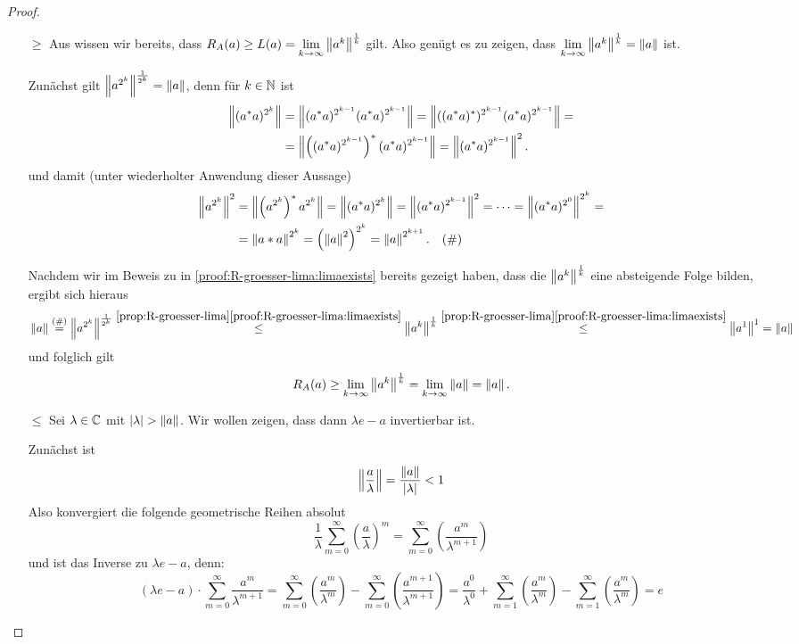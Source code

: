 \begin{proof}

\begin{itemize}
	\item[\glqq$\geq$\grqq] Aus  wissen wir bereits, dass $R_A(a) \geq L(a) = \underset{k\to\infty}{\lim}\left\lVert a^k\right\rVert^\frac{1}{k}$ gilt. Also genügt es zu zeigen, dass $\underset{k\to\infty}{\lim}\left\lVert a^k\right\rVert^\frac{1}{k} = \left\lVert a\right\rVert$ ist.
	
Zunächst gilt $\left\lVert a^{2^k}\right\rVert^\frac{1}{2^k} = \left\lVert a\right\rVert$, denn für $k \in \mathbb{N}$ ist
	\begin{align*}
	\left\lVert(a^*a)^{2^k}\right\rVert &= \left\lVert(a^*a)^{2^{k-1}}(a^*a)^{2^{k-1}}\right\rVert = \left\lVert((a^*a)^*)^{2^{k-1}}(a^*a)^{2^{k-1}}\right\rVert = \\
	&= \left\lVert\left((a^*a)^{2^{k-1}}\right)^*(a^*a)^{2^{k-1}}\right\rVert = \left\lVert(a^*a)^{2^{k-1}}\right\rVert^2.
	\end{align*}
und damit (unter wiederholter Anwendung dieser Aussage)
	\begin{align*}
	\left\lVert a^{2^k}\right\rVert^2 &= \left\lVert\left(a^{2^k}\right)^*a^{2^k}\right\rVert = \left\lVert(a^*a)^{2^k}\right\rVert = \left\lVert(a^*a)^{2^{k-1}}\right\rVert^2 = \dots = \left\lVert(a^*a)^{2^{0}}\right\rVert^{2^k} = \\
	&= \left\lVert a*a\right\rVert^{2^k} = \left(\left\lVert a\right\rVert^2\right)^{2^k} = \left\lVert a\right\rVert^{2^{k+1}}. \quad (\#)
	\end{align*}	
	
Nachdem wir im Beweis zu  in \ref{proof:R-groesser-lima:limaexists} bereits gezeigt haben, dass die $\left\lVert a^k\right\rVert^\frac{1}{k}$ eine absteigende Folge bilden, ergibt sich hieraus
	\[\norm{a} \overset{(\#)}{=} \norm{a^{2^k}}^\frac{1}{2^k} \overset{\ref*{prop:R-groesser-lima}\ref*{proof:R-groesser-lima:limaexists}}{\leq} \norm{a^{k}}^\frac{1}{k} \overset{\ref*{prop:R-groesser-lima}\ref*{proof:R-groesser-lima:limaexists}}{\leq} \norm{a^1}^1 = \norm{a}\]
und folglich gilt
	\[R_A(a) \geq \underset{k\to\infty}{\lim}\left\lVert a^k\right\rVert^\frac{1}{k} = \underset{k\to\infty}{\lim}\left\lVert a\right\rVert = \left\lVert a\right\rVert.\]	
	
	
	\item[\glqq$\leq$\grqq] Sei $\lambda \in \mathbb{C}$ mit $|\lambda| > \left\lVert a\right\rVert$. Wir wollen zeigen, dass dann $\lambda e - a$ invertierbar ist.

Zunächst ist
	\[\left\lVert\frac{a}{\lambda}\right\rVert = \frac{\left\lVert a\right\rVert}{|\lambda|} < 1\]
Also konvergiert die folgende geometrische Reihen absolut
	\[\frac{1}{\lambda}\sum_{m=0}^\infty\left(\frac{a}{\lambda}\right)^m = \sum_{m=0}^\infty\left(\frac{a^m}{\lambda^{m+1}}\right) \]
und ist das Inverse zu $\lambda e - a$, denn:
	\[(\lambda e - a)\cdot \sum_{m=0}^\infty\frac{a^m}{\lambda^{m+1}} = \sum_{m=0}^\infty\left(\frac{a^m}{\lambda^{m}}\right) - \sum_{m=0}^\infty\left(\frac{a^{m+1}}{\lambda^{m+1}}\right) = \frac{a^0}{\lambda^0} +  \sum_{m=1}^\infty\left(\frac{a^m}{\lambda^{m}}\right) - \sum_{m=1}^\infty\left(\frac{a^m}{\lambda^{m}}\right) = e\]
	

\end{itemize}
\end{proof}
